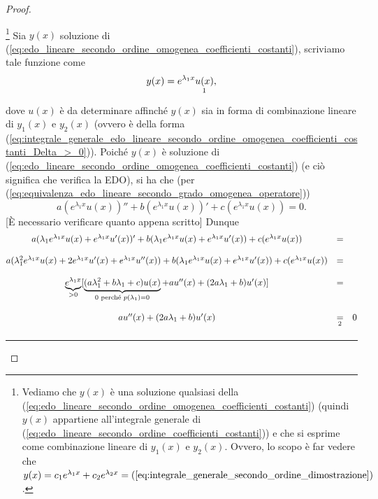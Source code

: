 \begin{proof}
\begin{enumerate}
		\footnote{Vediamo che $y(x)$ è una soluzione qualsiasi della (\ref{eq:edo_lineare_secondo_ordine_omogenea_coefficienti_costanti}) (quindi $y(x)$ appartiene all'integrale generale di (\ref{eq:edo_lineare_secondo_ordine_coefficienti_costanti})) e che si esprime come combinazione lineare di $y_1(x)$ e $y_2(x)$. Ovvero, lo scopo è far vedere che $y(x)=c_1 e^{\lambda_1x}+c_2e^{\lambda_2 x}=(\ref{eq:integrale_generale_secondo_ordine_dimostrazione})$.} Sia $y(x)$ soluzione di  (\ref{eq:edo_lineare_secondo_ordine_omogenea_coefficienti_costanti}), scriviamo tale funzione come
		\begin{equation}\label{eq:integrale_generale_secondo_ordine_dimostrazione}
			y(x) = e^{\lambda_1 x}\underset{\footnotemark}{u(x)},
		\end{equation}
		dove $u(x)$ è da determinare affinché $y(x)$ sia in forma di combinazione lineare di $y_1(x)$ e $y_2(x)$ (ovvero è della forma (\ref{eq:integrale_generale_edo_lineare_secondo_ordine_omogenea_coefficienti_costanti_Delta_>_0})).
		Poiché $y(x)$ è soluzione di  (\ref{eq:edo_lineare_secondo_ordine_omogenea_coefficienti_costanti}) (e ciò significa che verifica la EDO), si ha che (per (\ref{eq:equivalenza_edo_lineare_secondo_grado_omogenea_operatore}))
		\begin{equation*}
			a(e^{\lambda_1x}u(x))''+ b(e^{\lambda_1x}u(x))'+ c (e^{\lambda_1x}u(x)) = 0.
		\end{equation*}
		[È necessario verificare quanto appena scritto] Dunque
		\begin{equation}\label{eq:dimostrazione_th_soluzioni_edo_secondo_ordine}
			\begin{matrix}
				a(\lambda_1e^{\lambda_1x}u(x)+e^{\lambda_1x}u'(x))' + b(\lambda_1 e^{\lambda_1 x}u(x) + e^{\lambda_1x}u'(x)) + c(e^{\lambda_1x}u(x)) &=&\\\\
				a(\lambda_1^2e^{\lambda_1 x}u(x) + 2 e^{\lambda_1 x} u'(x) + e^{\lambda_1 x}u''(x))+ b (\lambda_1 e^{\lambda_1 x}u(x) + e^{\lambda_1 x}u'(x)) + 
				c(e^{\lambda_1 x}u(x)) &=&\\\\
				 \underbrace{e^{\lambda_1 x}}_{>0} [\underbrace{(a\lambda_1^2+b\lambda_1 +c) u(x)}_{0\text{ perché } p(\lambda_1)=0} + a u''(x)+(2a\lambda_1 + b)u'(x)]&=&\\\\
				 a u''(x)+(2a\lambda_1 + b)u'(x) &\underset{\footnotemark}{=}& 0
			\end{matrix}
		\end{equation}
		\hrule\vspace{-12px}

\end{enumerate}
\end{proof}
